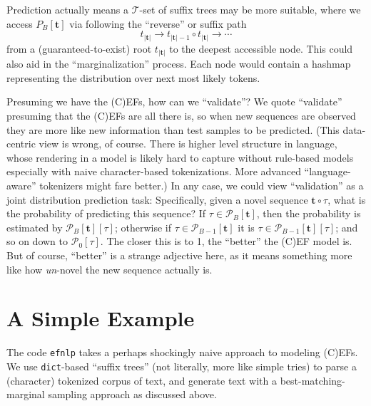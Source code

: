 \documentclass[11pt, oneside]{amsart}   	%
\begin{document}
Prediction actually means a $\mathcal{T}$-set of suffix trees may be more suitable, where we access $P_B[\mathbf{t}]$ via following the ``reverse'' or suffix path 
\begin{equation*}
	t_{|\mathbf{t}|} \rightarrow t_{|\mathbf{t}|-1} \circ t_{|\mathbf{t}|} \rightarrow \dotsb
\end{equation*}
from a (guaranteed-to-exist) root $t_{|\mathbf{t}|}$ to the deepest accessible node. This could also aid in the ``marginalization'' process. Each node would contain  a hashmap representing the distribution over next most likely tokens. 

Presuming we have the (C)EFs, how can we ``validate''? We quote ``validate'' presuming that the (C)EFs are all there is, so when new sequences are observed they are more like new information than test samples to be predicted. (This data-centric view is wrong, of course. There is higher level structure in language, whose rendering in a model is likely hard to capture without rule-based models especially with naive character-based tokenizations. More advanced ``language-aware'' tokenizers might fare better.) In any case, we could view ``validation'' as a joint distribution prediction task: Specifically, given a novel sequence $\mathbf{t} \circ \tau$, what is the probability of predicting this sequence? If $\tau \in \mathcal{P}_B[\mathbf{t}]$, then the probability is estimated by $\mathcal{P}_B[\mathbf{t}][\tau]$; otherwise if $\tau \in \mathcal{P}_{B-1}[\mathbf{t}]$ it is $\tau \in \mathcal{P}_{B-1}[\mathbf{t}][\tau]$; and so on down to $\mathcal{P}_0[\tau]$. The closer this is to 1, the ``better'' the (C)EF model is. But of course, ``better'' is a strange adjective here, as it means something more like how {\em un}-novel the new sequence actually is. 

\section{A Simple Example}

The code \texttt{efnlp} takes a perhaps shockingly naive approach to modeling (C)EFs. We use \texttt{dict}-based ``suffix trees'' (not literally, more like simple tries) to parse a (character) tokenized corpus of text, and generate text with a best-matching-marginal sampling approach as discussed above. 
\end{document}
